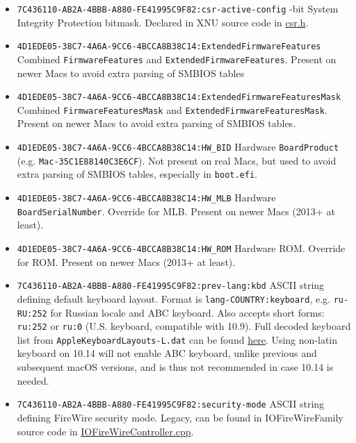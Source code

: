 \documentclass[]{article}
\providecommand{\tightlist}{%
  \setlength{\itemsep}{0pt}\setlength{\parskip}{0pt}}
\begin{document}
\begin{itemize}
\tightlist
\item
  \texttt{7C436110-AB2A-4BBB-A880-FE41995C9F82:csr-active-config}
  -bit System Integrity Protection bitmask. Declared in XNU source code in
  \href{https://opensource.apple.com/source/xnu/xnu-4570.71.2/bsd/sys/csr.h.auto.html}{csr.h}.
\item
  \texttt{4D1EDE05-38C7-4A6A-9CC6-4BCCA8B38C14:ExtendedFirmwareFeatures}
  \break
  Combined \texttt{FirmwareFeatures} and \texttt{ExtendedFirmwareFeatures}. Present on
  newer Macs to avoid extra parsing of SMBIOS tables
\item
  \texttt{4D1EDE05-38C7-4A6A-9CC6-4BCCA8B38C14:ExtendedFirmwareFeaturesMask}
  \break
  Combined \texttt{FirmwareFeaturesMask} and \texttt{ExtendedFirmwareFeaturesMask}.
  Present on newer Macs to avoid extra parsing of SMBIOS tables.
\item
  \texttt{4D1EDE05-38C7-4A6A-9CC6-4BCCA8B38C14:HW\_BID}
  \break
  Hardware \texttt{BoardProduct} (e.g. \texttt{Mac-35C1E88140C3E6CF}). Not present on
  real Macs, but used to avoid extra parsing of SMBIOS tables, especially in \texttt{boot.efi}.
\item
  \texttt{4D1EDE05-38C7-4A6A-9CC6-4BCCA8B38C14:HW\_MLB}
  \break
  Hardware \texttt{BoardSerialNumber}. Override for MLB. Present on newer Macs (2013+ at least).
\item
  \texttt{4D1EDE05-38C7-4A6A-9CC6-4BCCA8B38C14:HW\_ROM}
  \break
  Hardware ROM. Override for ROM. Present on newer Macs (2013+ at least).
\item
  \texttt{7C436110-AB2A-4BBB-A880-FE41995C9F82:prev-lang:kbd}
  \break
  ASCII string defining default keyboard layout. Format is \texttt{lang-COUNTRY:keyboard},
  e.g. \texttt{ru-RU:252} for Russian locale and ABC keyboard. Also accepts short forms:
  \texttt{ru:252} or \texttt{ru:0} (U.S. keyboard, compatible with 10.9). Full decoded
  keyboard list from \texttt{AppleKeyboardLayouts-L.dat} can be found
  \href{https://github.com/acidanthera/OpenCorePkg/tree/master/Utilities/AppleKeyboardLayouts}{here}. Using non-latin keyboard on 10.14
  will not enable ABC keyboard, unlike previous and subsequent macOS versions, and is thus not recommended in case 10.14 is needed.
\item
  \texttt{7C436110-AB2A-4BBB-A880-FE41995C9F82:security-mode}
  \break
  ASCII string defining FireWire security mode. Legacy, can be found in IOFireWireFamily
  source code in
  \href{https://opensource.apple.com/source/IOFireWireFamily/IOFireWireFamily-473/IOFireWireFamily.kmodproj/IOFireWireController.cpp.auto.html}{IOFireWireController.cpp}.

\end{itemize}
\end{document}
